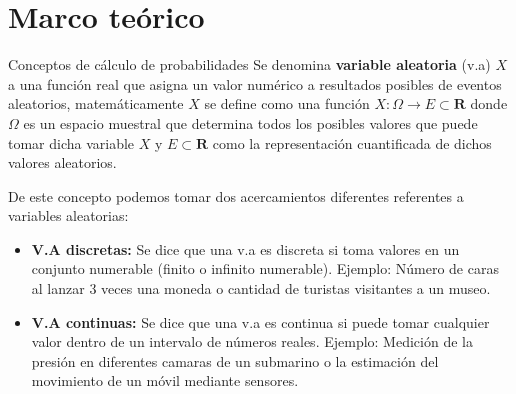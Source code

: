 \documentclass[10pt]{beamer}
\begin{document}
	\section{Marco teórico}
		\begin{frame}{Conceptos de cálculo de probabilidades}
            Se denomina \textbf{variable aleatoria} (v.a) $X$ a una función real que asigna un valor numérico a resultados posibles de eventos aleatorios, matemáticamente $X$ se define como una función $X:\Omega \rightarrow E \subset\mathbf{R}$ donde $\Omega$ es un espacio muestral que determina todos los posibles valores que puede tomar dicha variable $X$ y $E \subset \mathbf{R}$ como la representación cuantificada de dichos valores aleatorios.

            De este concepto podemos tomar dos acercamientos diferentes referentes a variables aleatorias:
            \begin{itemize}
                \item \textbf{V.A discretas:} Se dice que una v.a es discreta si toma valores en un conjunto numerable (finito o infinito numerable). Ejemplo: Número de caras al lanzar 3 veces una moneda o cantidad de turistas visitantes a un museo.
                \item \textbf{V.A continuas:} Se dice que una v.a es continua si puede tomar cualquier valor dentro de un intervalo de números reales. Ejemplo: Medición de la presión en diferentes camaras de un submarino o la estimación del movimiento de un móvil mediante sensores.
            \end{itemize}
		\end{frame}
\end{document}
